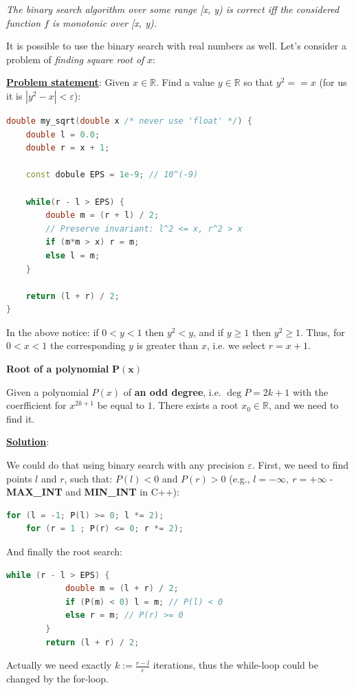 \begin{lemma}
    \textit{The binary search algorithm over some range [x, y) is correct iff the considered function $f$ is monotonic over [x, y).}
\end{lemma}




It is possible to use the binary search with real numbers as well. Let's consider a problem of \textit{finding square root of} $x$:

\underline{\textbf{Problem statement}}: Given $x \in \mathbb{R}$. Find a value $y \in \mathbb{R}$ so that $y^2 == x$ (for us it is $|y^2 - x| < \varepsilon$):

\begin{lstlisting}[language=C++]
double my_sqrt(double x /* never use 'float' */) {
    double l = 0.0;
    double r = x + 1;

    const dobule EPS = 1e-9; // 10^(-9)

    while(r - l > EPS) {
        double m = (r + l) / 2;
        // Preserve invariant: l^2 <= x, r^2 > x
        if (m*m > x) r = m;
        else l = m;
    }

    return (l + r) / 2;
}
\end{lstlisting}

In the above notice: if $0 < y < 1$ then $y^2 < y$, and if $y \geq 1$ then $y^2 \geq 1$. Thus, for $0 < x < 1$ the corresponding $y$ is greater than $x$, i.e. we select $r = x + 1$.

\begin{example} \textbf{Root of a polynomial} $\mathbf{P(x)}$

    Given a polynomial $P(x)$ of \textbf{an odd degree}, i.e. $\deg{P} = 2k + 1$ with the coerfficient for $x^{2k+1}$ be equal to $1$. There exists a root $x_0 \in \mathbb{R}$, and we need to find it.

    \underline{\textbf{Solution}}:

    We could do that using binary search with any precision $\varepsilon$. First, we need to find points $l$ and $r$, such that: $P(l) < 0$ and $P(r) > 0$ (e.g., $l=-\infty, \ r=+\infty$ - \textbf{MAX\_INT} and \textbf{MIN\_INT} in C++):

    \begin{lstlisting}[language=C++]
    for (l = -1; P(l) >= 0; l *= 2);
    for (r = 1 ; P(r) <= 0; r *= 2);
    \end{lstlisting}

    And finally the root search:

    \begin{lstlisting}[language=C++]
        while (r - l > EPS) {
            double m = (l + r) / 2;
            if (P(m) < 0) l = m; // P(l) < 0
            else r = m; // P(r) >= 0
        }
        return (l + r) / 2;
    \end{lstlisting}

    Actually we need exactly $k := \frac{r-l}{\varepsilon}$ iterations, thus the while-loop could be changed by the for-loop.

\end{example}